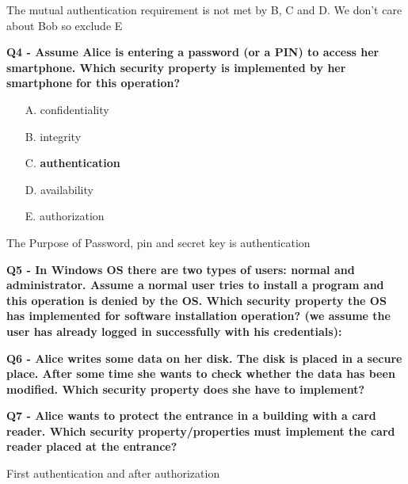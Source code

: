 \textcolor{Comment}{The mutual authentication requirement is not met by B, C and D. We don't care about Bob so exclude E}

\textbf{Q4 - Assume Alice is entering a password (or a PIN) to access her smartphone. Which security property is implemented by her smartphone for this operation?}
\begin{enumerate}
    \item[A.] confidentiality
    \item[B.] integrity
    \item[C.] \textbf{authentication}
    \item[D.] availability
    \item[E.] authorization
\end{enumerate}

\textcolor{Comment}{The Purpose of Password, pin and secret key is authentication}

\textbf{Q5 - In Windows OS there are two types of users: normal and administrator. Assume a normal user tries to install a program and this operation is denied by the OS. Which security property the OS has implemented for software installation operation? (we assume the user has already logged in successfully with his credentials):}



\textbf{Q6 - Alice writes some data on her disk. The disk is placed in a secure place. After some time she wants to check whether the data has been modified. Which security property does she have to implement?}

\textbf{Q7 - Alice wants to protect the entrance in a building with a card reader. Which security property/properties must implement the card reader placed at the entrance?}
\textcolor{Comment}{First authentication and after authorization}

